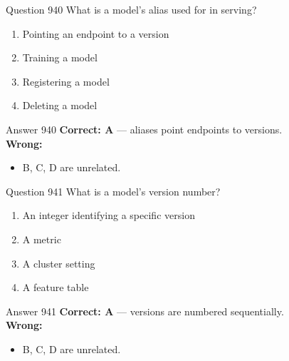 \documentclass[aspectratio=169,11pt]{beamer}
\begin{document}
	\begin{frame}{Question 940}
		What is a model's alias used for in serving?
		\begin{enumerate}[label=\Alph*.]
			\item Pointing an endpoint to a version
			\item Training a model
			\item Registering a model
			\item Deleting a model
		\end{enumerate}
	\end{frame}
	\begin{frame}{Answer 940}
		\textbf{Correct: A} --- aliases point endpoints to versions.\\
		\vspace{0.5em}
		\textbf{Wrong:}
		\begin{itemize}
			\item B, C, D are unrelated.
		\end{itemize}
	\end{frame}
	
	\begin{frame}{Question 941}
		What is a model's version number?
		\begin{enumerate}[label=\Alph*.]
			\item An integer identifying a specific version
			\item A metric
			\item A cluster setting
			\item A feature table
		\end{enumerate}
	\end{frame}
	\begin{frame}{Answer 941}
		\textbf{Correct: A} --- versions are numbered sequentially.\\
		\vspace{0.5em}
		\textbf{Wrong:}
		\begin{itemize}
			\item B, C, D are unrelated.
		\end{itemize}
	\end{frame}
	
\end{document}
